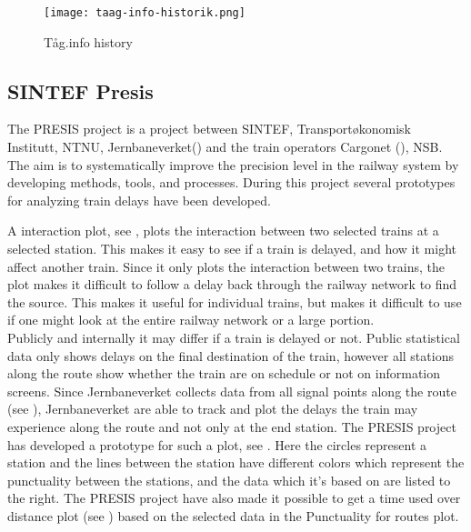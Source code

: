 \begin{figure}[!htbp]
	\texttt{[image: taag-info-historik.png]}
	\caption[Tåg.info history]{Tåg.info history
	\cite{taagInfo}}
	\label{fig:taag-info-historik}
\end{figure}


\subsection{SINTEF Presis}
\label{sub:subsection_sintefPresis}

The PRESIS\cite{sintefPresis} project is a project between SINTEF\cite{sintef},
Transportøkonomisk Institutt\cite{transportOkonomiskInstitutt},
NTNU\cite{ntnu}, Jernbaneverket() 
and the train operators Cargonet (), NSB\cite{nsbForside}. The aim is to systematically improve the precision 
level in the railway system by developing methods, tools, and processes. During
this project several prototypes for analyzing train delays have been developed.

A interaction plot, see , plots the interaction
between two selected trains at a selected station. This makes it easy to see 
if a train is delayed, and how it might affect another train. Since it only
plots the interaction between two trains, the plot makes it difficult to 
follow a delay back through the railway network to find the source.
This makes it useful for individual trains, but makes it difficult to use if
one might look at the entire railway network or a large portion. \\

Publicly and internally it may differ if a train is delayed or not. Public
statistical data only shows delays on the final destination of the train,
however all stations along the route show whether the train are on schedule or 
not on information screens. Since Jernbaneverket collects data from all signal 
points along the route (see ), 
Jernbaneverket are able to track and plot the delays the train may experience 
along the route and not only at the end station. The PRESIS project has 
developed a prototype for such a plot, see . Here the 
circles represent a station and the lines between the station have different 
colors which represent the punctuality between the stations, and the data 
which it's based on are listed to the right. The PRESIS project have also made 
it possible to get a time used over distance plot (see ) based on the selected data in the Punctuality for routes plot. 

